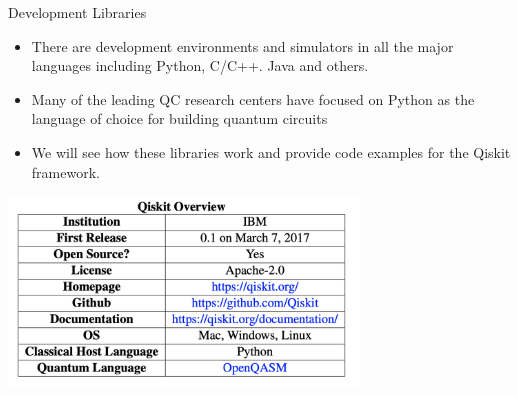 \begin{frame}{Development Libraries}
\begin{itemize}
    \item There are development environments and simulators in all the major languages including Python, C/C++. Java and others.
    \item Many of the leading QC research centers have focused on Python as the language of choice for building quantum circuits 
    \item We will see how these libraries work and provide code examples for the \alert{Qiskit} framework.
    
\end{itemize}
\begin{center}
        \includegraphics[width=0.7\textwidth]{img/qiskit-overview.png}
\end{center}

\end{frame}